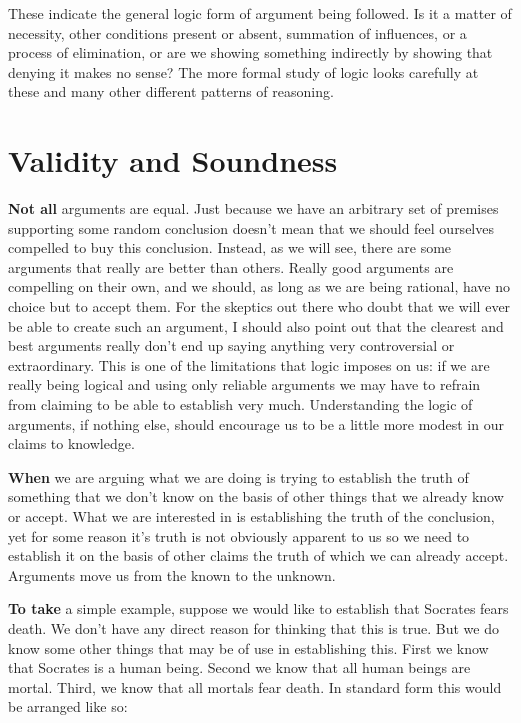 \documentclass[]{book}
\begin{document}
These indicate the general logic form of argument being followed. Is it a matter of necessity, other conditions present or absent, summation of influences, or a process of elimination, or are we showing something indirectly by showing that denying it makes no sense? The more formal study of logic looks carefully at these and many other different patterns of reasoning.

\hypertarget{validity-and-soundness}{%
\section{Validity and Soundness}\label{validity-and-soundness}}

\textbf{Not all} arguments are equal. Just because we have an arbitrary set of premises supporting some random conclusion doesn't mean that we should feel ourselves compelled to buy this conclusion. Instead, as we will see, there are some arguments that really are better than others. Really good arguments are compelling on their own, and we should, as long as we are being rational, have no choice but to accept them. For the skeptics out there who doubt that we will ever be able to create such an argument, I should also point out that the clearest and best arguments really don't end up saying anything very controversial or extraordinary. This is one of the limitations that logic imposes on us: if we are really being logical and using only reliable arguments we may have to refrain from claiming to be able to establish very much. Understanding the logic of arguments, if nothing else, should encourage us to be a little more modest in our claims to knowledge.

\textbf{When} we are arguing what we are doing is trying to establish the truth of something that we don't know on the basis of other things that we already know or accept. What we are interested in is establishing the truth of the conclusion, yet for some reason it's truth is not obviously apparent to us so we need to establish it on the basis of other claims the truth of which we can already accept. Arguments move us from the known to the unknown.

\textbf{To take} a simple example, suppose we would like to establish that Socrates fears death. We don't have any direct reason for thinking that this is true. But we do know some other things that may be of use in establishing this. First we know that Socrates is a human being. Second we know that all human beings are mortal. Third, we know that all mortals fear death. In standard form this would be arranged like so:
\end{document}
